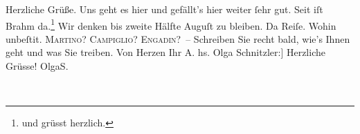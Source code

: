 \begin{ledgroupsized}[t]{13cm}
           \pstart
           {\pb}Herzliche Grüße. Uns geht es hier und gefällt’s hier
               weiter ſehr gut. Seit \label{K_L01784-1v}\label{K_L01784-1h} iſt Brahm da.\footnote{\noindent{}und grüsst herzlich.} Wir denken bis zweite Hälfte Auguſt zu bleiben. Da{\geminationn} Reiſe. Wohin unbeſti{\geminationm}t.
                  \textsc{Martino}? \textsc{Campiglio}? \textsc{Engadin}? – Schreiben Sie recht bald, wie’s Ihnen geht und was Sie {\pb}treiben. \pend
           \pstart Von Herzen Ihr \spacefill\mbox{A.}\pend{}\pstart
           \noindent{}{[}hs. Olga Schnitzler:{]} Herzliche Grüsse!\pend
           \pstart \spacefill\mbox{OlgaS.}\pend{}
         
         \endnumbering{}\end{ledgroupsized}  \newcommand{\dateiname}{L01784}\newcommand{\titel}{Arthur und Olga Schnitzler an Richard Beer-Hofmann, 20. 7. 1908}\newcommand{\editorInnen}{Martin Anton Müller und Gerd-Hermann Susen}
      